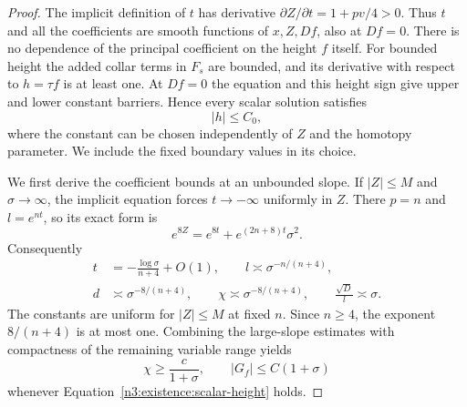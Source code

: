 \begin{proof}
The implicit definition of $t$ has derivative
$\partial Z/\partial t=1+pv/4>0$.  Thus $t$ and all the
coefficients are smooth functions of $x,Z,Df$, also at $Df=0$.
There is no dependence of the principal coefficient on the height
$f$ itself.  For bounded height the added collar terms in $F_s$
are bounded, and its derivative with respect to $h=\tau f$ is at
least one.  At $Df=0$ the equation and this height sign give
upper and lower constant barriers.  Hence every scalar solution
satisfies
\begin{equation}\label{n3:existence:scalar-height}
 |h|\le C_0,
\end{equation}
where the constant can be chosen independently of $Z$ and the
homotopy parameter.  We include the fixed boundary values in its
choice.

We first derive the coefficient bounds at an unbounded slope.
If $|Z|\le M$ and $\sigma\to\infty$, the implicit equation forces
$t\to-\infty$ uniformly in $Z$.  There $p=n$ and $l=e^{nt}$,
so its exact form is
\begin{equation}\label{n3:existence:implicit-large-slope}
 e^{8Z}=e^{8t}+e^{(2n+8)t}\sigma^2.
\end{equation}
Consequently
\begin{equation}\label{n3:existence:large-slope-asymptotics}
 \begin{split}
 t&=-\frac{\log\sigma}{n+4}+O(1),\qquad
 l\asymp\sigma^{-n/(n+4)},\\
 d&\asymp\sigma^{-8/(n+4)},\qquad
 \chi\asymp\sigma^{-8/(n+4)},\qquad
 \frac{\sqrt D}{l}\asymp\sigma.
 \end{split}
\end{equation}
The constants are uniform for $|Z|\le M$ at fixed $n$.
Since $n\ge4$, the exponent $8/(n+4)$ is at most one.  Combining
the large-slope estimates with compactness of the remaining variable
range yields
\begin{equation}\label{n3:existence:scalar-growth}
 \chi\ge\frac{c}{1+\sigma},\qquad
 |G_f|\le C(1+\sigma)
\end{equation}
whenever Equation~\eqref{n3:existence:scalar-height} holds.


\end{proof}
